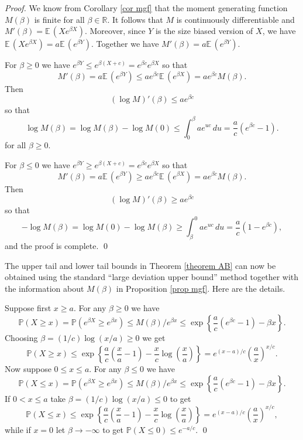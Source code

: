 \documentclass[smallextended,envcountsect]{svjour3}
\begin{document}
\begin{proof}  We know from Corollary \ref{cor mgf} that the moment generating function $M(\beta)$ is finite for all $\beta \in{\mathbb{R}}$.  It follows that $M$ is continuously differentiable and $ M'(\beta) = {\mathbb{E \,}}(Xe^{\beta X})$.  Moreover, since $Y$ is the size biased version of $X$, we have ${\mathbb{E \,}}(Xe^{\beta X})  = a {\mathbb{E \,}}(e^{\beta Y})$.  Together we have
    $
    M'(\beta)  = a {\mathbb{E \,}}(e^{\beta Y}).
    $

For $\beta  \ge 0$ we have $e^{\beta Y} \le e^{\beta (X+c)} = e^{\beta c}e^{\beta X}$ so that
       $$
       M'(\beta ) = a {\mathbb{E \,}}(e^{\beta Y}) \le ae^{\beta c} {\mathbb{E \,}}(e^{\beta X}) = a e^{\beta c} M(\beta ).
       $$
Then
      $$
     (\log M)'(\beta ) \le a e^{\beta c}
      $$
so that
$$ 
   {{\log M}}(\beta) = {{\log M}}(\beta)-{{\log M}}(0)  \le \int_0^\beta  a e^{uc}\,du = \frac{a}{c}\left(e^{\beta c}-1\right).
$$ 
  for all $\beta \ge 0$.

For $\beta  \le 0$ we have $e^{\beta Y} \ge e^{\beta (X+c)} = e^{\beta c}e^{\beta X}$ so that
       $$
       M'(\beta ) = a {\mathbb{E \,}}(e^{\beta Y}) \ge ae^{\beta c} {\mathbb{E \,}}(e^{\beta X}) = a e^{\beta c} M(\beta ).
       $$
Then
      $$
      ({{\log M}})'(\beta ) \ge a e^{\beta c}
      $$
so that
    $$
  -{{\log M}}(\beta) = {{\log M}}(0)  - {{\log M}}(\beta ) \ge \int_\beta ^0 a e^{uc}\,du = \frac{a}{c}\left(1-e^{\beta c}\right),
    $$
  and the proof is complete.
     \qed \end{proof}

The upper tail and lower tail bounds in Theorem \ref{theorem AB} can now be obtained using the standard ``large deviation upper bound'' method together with the information about $M(\beta)$ in Proposition \ref{prop mgf}.  Here are the details.

 \vspace{2ex}

  Suppose first $x \ge a$.  For any $\beta  \ge 0$ we have
   $$
   {\mathbb{P}} (X \ge x) = {\mathbb{P}}(e^{\beta X} \ge e^{\beta x}) \le M(\beta )/e^{\beta x} \le \exp\left\{ \frac{a}{c}\left(e^{\beta c}-1 \right)-\beta x \right\}.
   $$
Choosing $\beta  = (1/c) \log(x/a) \ge 0$ we get
   $$
   {\mathbb{P}}(X \ge x) \le  \exp\left\{ \frac{a}{c}\left(\frac{x}{a}-1\right)-\frac{x}{c} \log\left(\frac{x}{a}\right)  \right\}
    = e^{(x-a)/c} \left(\frac{a}{x}\right)^{x/c}.
    $$
Now suppose $0 \le x \le a$.  For any $\beta  \le 0$ we have
   $$
   {\mathbb{P}} (X \le x) = {\mathbb{P}}(e^{\beta X} \ge e^{\beta x}) \le M(\beta )/e^{\beta x} \le \exp\left\{ \frac{a}{c}\left(e^{\beta c}-1 \right)-\beta x \right\}.
   $$
If $0 < x \le a$ take $\beta  = (1/c) \log(x/a) \le 0$ to get
   $$
   {\mathbb{P}}(X \le x) \le  \exp\left\{ \frac{a}{c}\left(\frac{x}{a}-1\right)-\frac{x}{c} \log\left(\frac{x}{a}\right)  \right\}
    = e^{(x-a)/c} \left(\frac{a}{x}\right)^{x/c},
    $$
while if $x = 0$ let $\beta \to -\infty$ to get ${\mathbb{P}}(X \le 0) \le e^{-a/c}$.
\qed
\end{document}

